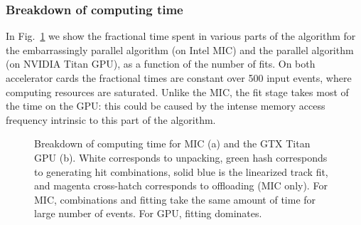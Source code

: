 \documentclass[a4]{jpconf}
\begin{document}
\subsubsection{Breakdown of computing time}
In Fig.~\ref{fig:breakdown} we show the fractional time spent in
various parts of the algorithm for the embarrassingly parallel algorithm 
(on Intel MIC) and the parallel algorithm (on NVIDIA Titan GPU), as a 
function of the number of fits. On both accelerator cards the fractional times
are constant over 500 input events, where computing resources are saturated. 
Unlike the MIC, the fit stage takes most of the time on the GPU: this 
could be caused by the intense memory access frequency intrinsic to
this part of the algorithm.  
\begin{figure}[tbp]
\centering
{}
\caption{Breakdown of computing time for MIC (a) and the GTX Titan GPU
  (b). White corresponds to unpacking, green hash corresponds to
  generating hit combinations, solid blue is the linearized track fit,
  and magenta cross-hatch corresponds to offloading (MIC only). For
  MIC, combinations and fitting take the same amount of time for large
  number of events. For GPU, fitting dominates. }
\label{fig:breakdown}
\end{figure}
\end{document}
